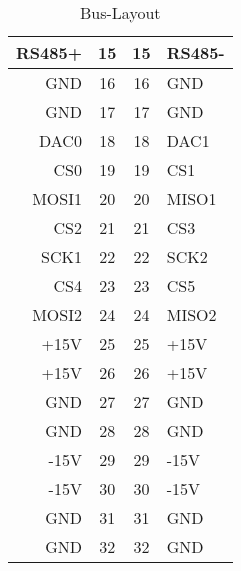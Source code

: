 \begin{table}[H]
\begin{tabular}{|r|c|c|l|}
\cellcolor[HTML]{9B9B9B}RS485+    	& 	15 	& 	15 	& 	\cellcolor[HTML]{9B9B9B}RS485-           	\\ \hline
\cellcolor[HTML]{0066ff}GND   	& 	16 	& 	16 	& 	\cellcolor[HTML]{0066ff}GND            	\\ \hline
\cellcolor[HTML]{0066ff}GND   	& 	17 	& 	17 	& 	\cellcolor[HTML]{0066ff}GND         	\\ \hline
\cellcolor[HTML]{996633}DAC0  	& 	18 	& 	18 	& 	\cellcolor[HTML]{996633}DAC1         	\\ \hline
\cellcolor[HTML]{32CB00}CS0    	& 	19 	& 	19 	& 	\cellcolor[HTML]{32CB00}CS1             	\\ \hline
\cellcolor[HTML]{FFC702}MOSI1    	& 	20 	& 	20 	& 	\cellcolor[HTML]{FFC702}MISO1             	\\ \hline
\cellcolor[HTML]{32CB00}CS2    	& 	21 	& 	21 	& 	\cellcolor[HTML]{32CB00}CS3             	\\ \hline
\cellcolor[HTML]{FFC702}SCK1    	& 	22 	& 	22 	& 	\cellcolor[HTML]{FFC702}SCK2           	\\ \hline
\cellcolor[HTML]{32CB00}CS4 	& 	23 	& 	23 	& 	\cellcolor[HTML]{32CB00}CS5      		\\ \hline
\cellcolor[HTML]{FFC702}MOSI2 	& 	24 	& 	24 	& 	\cellcolor[HTML]{FFC702}MISO2           	\\ \hline
\cellcolor[HTML]{FE0000}+15V  	& 	25 	& 	25 	& 	\cellcolor[HTML]{FE0000}+15V           	\\ \hline
\cellcolor[HTML]{FE0000}+15V  	& 	26 	& 	26 	& 	\cellcolor[HTML]{FE0000}+15V       		\\ \hline
\cellcolor[HTML]{0066ff}GND   	& 	27 	& 	27 	& 	\cellcolor[HTML]{0066ff}GND         	\\ \hline
\cellcolor[HTML]{0066ff}GND   	& 	28 	& 	28 	& 	\cellcolor[HTML]{0066ff}GND          	\\ \hline
\cellcolor[HTML]{FE0000}-15V  	& 	29 	& 	29 	& 	\cellcolor[HTML]{FE0000}-15V         	\\ \hline
\cellcolor[HTML]{FE0000}-15V  	& 	30 	& 	30 	& 	\cellcolor[HTML]{FE0000}-15V          	\\ \hline
\cellcolor[HTML]{0066ff}GND   	& 	31 	& 	31 	& 	\cellcolor[HTML]{0066ff}GND         	\\ \hline
\cellcolor[HTML]{0066ff}GND   	& 	32 	& 	32 	& 	\cellcolor[HTML]{0066ff}GND 			\\ \hline
\end{tabular}
\caption{Bus-Layout}
\label{tab:Bus-Layout}
\end{table}
